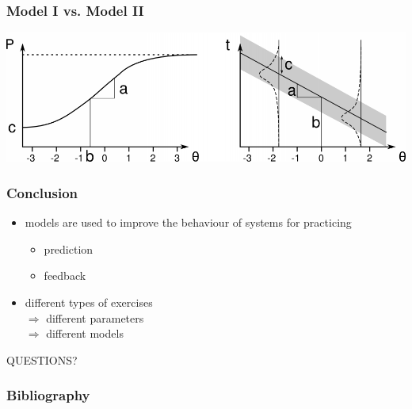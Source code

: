 \documentclass[xcolor=svgnames]{beamer}
\begin{document}
\begin{frame}
	\frametitle{Model I vs. Model II}

	\begin{center}
		\includegraphics[width=.95\textwidth]{2013-VV041-student-modeling/models-compare.png}
	\end{center}
\end{frame}
\begin{frame}
	\frametitle{Conclusion}
	\begin{itemize}
		\item 	models are used to improve the behaviour of systems for practicing
			\begin{itemize}
				\item 	prediction
				\item 	feedback
			\end{itemize}
		\item 	different types of exercises \\
						$\Rightarrow$ different parameters \\
						$\Rightarrow$ different models
	\end{itemize}
\end{frame}
\begin{frame}
	\begin{center}
		{\Huge QUESTIONS?}
	\end{center}
\end{frame}
\begin{frame}[allowframebreaks]
	\frametitle<presentation>{Bibliography}
	
	\nocite{Jarusek2013thesis}
	
\end{frame}
\end{document}
